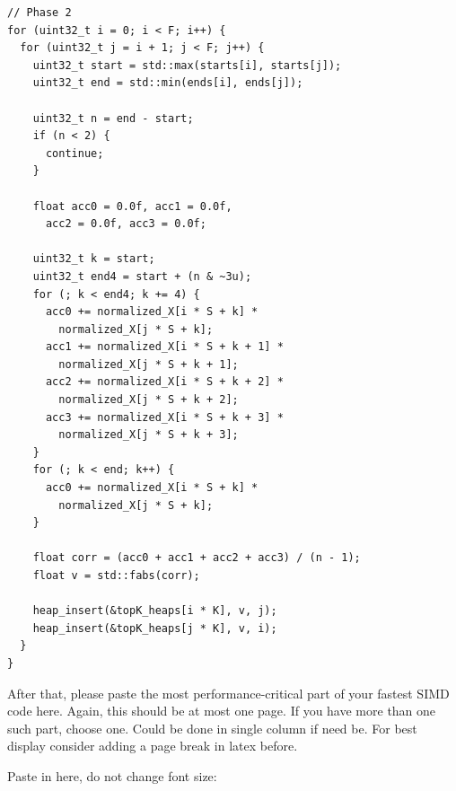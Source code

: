 \documentclass[letterpaper]{article}
\begin{document}
{\fontsize{8}{10}\selectfont
\begin{Verbatim}
// Phase 2
for (uint32_t i = 0; i < F; i++) {
  for (uint32_t j = i + 1; j < F; j++) {
    uint32_t start = std::max(starts[i], starts[j]);
    uint32_t end = std::min(ends[i], ends[j]);

    uint32_t n = end - start;
    if (n < 2) {
      continue;
    }

    float acc0 = 0.0f, acc1 = 0.0f, 
      acc2 = 0.0f, acc3 = 0.0f;

    uint32_t k = start;
    uint32_t end4 = start + (n & ~3u);
    for (; k < end4; k += 4) {
      acc0 += normalized_X[i * S + k] * 
        normalized_X[j * S + k];
      acc1 += normalized_X[i * S + k + 1] * 
        normalized_X[j * S + k + 1];
      acc2 += normalized_X[i * S + k + 2] * 
        normalized_X[j * S + k + 2];
      acc3 += normalized_X[i * S + k + 3] * 
        normalized_X[j * S + k + 3];
    }
    for (; k < end; k++) {
      acc0 += normalized_X[i * S + k] * 
        normalized_X[j * S + k];
    }

    float corr = (acc0 + acc1 + acc2 + acc3) / (n - 1);
    float v = std::fabs(corr);

    heap_insert(&topK_heaps[i * K], v, j);
    heap_insert(&topK_heaps[j * K], v, i);
  }
}
\end{Verbatim}
}

After that, please paste the most performance-critical part of your fastest SIMD code here. Again, this should be at most one page. If you have more than one such part, choose one. Could be done in single column if need be. For best display consider adding a page break in latex before.

Paste in here, do not change font size:
\end{document}

